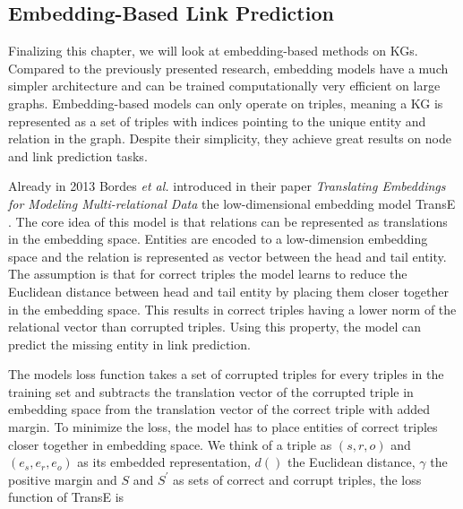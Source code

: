 

\subsection{Embedding-Based Link Prediction}
\label{ssec:embedlp}
Finalizing this chapter, we will look at embedding-based methods on KGs.
Compared to the previously presented research, embedding models have a much simpler architecture and can be trained computationally very efficient on large graphs. Embedding-based models can only operate on triples, meaning a KG is represented as a set of triples with indices pointing to the unique entity and relation in the graph. Despite their simplicity, they achieve great results on node and link prediction tasks.

Already in 2013 Bordes \textit{et al.} introduced in their paper \textit{Translating Embeddings for Modeling Multi-relational Data} the low-dimensional embedding model TransE \cite{bordes_translating_2013}. The core idea of this model is that relations can be represented as translations in the embedding space. Entities are encoded to a low-dimension embedding space and the relation is represented as vector between the head and tail entity. The assumption is that for correct triples the model learns to reduce the Euclidean distance between head and tail entity by placing them closer together in the embedding space. This results in correct triples having a lower norm of the relational vector than corrupted triples. Using this property, the model can predict the missing entity in link prediction.

The models loss function takes a set of corrupted triples for every triples in the training set and subtracts the translation vector of the corrupted triple in embedding space from the translation vector of the correct triple with added margin. To minimize the loss, the model has to place entities of correct triples closer together in embedding space. We think of a triple as $(s,r,o)$ and $(e_s,e_r,e_o)$ as its embedded representation, $d()$ the Euclidean distance, $\gamma$ the positive margin and $S$ and $S^{\prime}$ as sets of correct and corrupt triples, the loss function of TransE is 


